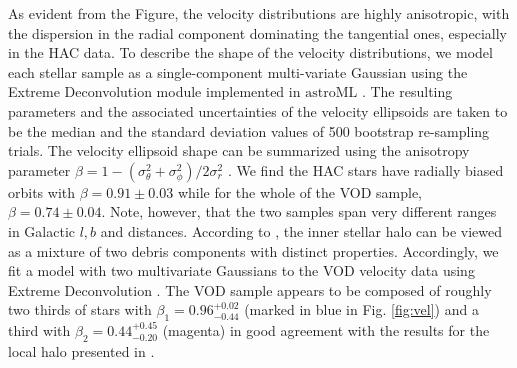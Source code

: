\documentclass[fleqn,usenatbib]{mnras}
\begin{document}
As evident from the Figure, the velocity distributions are highly
anisotropic, with the dispersion in the radial component dominating
the tangential ones, especially in the HAC data. To describe the shape
of the velocity distributions, we model each stellar sample as a
single-component multi-variate Gaussian using the Extreme
Deconvolution module implemented in $\mathrm{astroML}$
\citep{astroML}. The resulting parameters and the associated
uncertainties of the velocity ellipsoids are taken to be the median
and the standard deviation values of 500 bootstrap re-sampling trials.
The velocity ellipsoid shape can be summarized using the anisotropy
parameter $\beta=1-(\sigma^2_{\theta}+\sigma^2_{\phi})/2\sigma^2_r$
\citep[see][]{Binney2008}. We find the HAC stars have radially biased
orbits with $\beta = 0.91 \pm 0.03$ while for the whole of the VOD
sample, $\beta = 0.74 \pm 0.04$. Note, however, that the two samples
span very different ranges in Galactic $l,b$ and distances. According
to \citet{Belokurov2018}, the inner stellar halo can be viewed as a
mixture of two debris components with distinct
properties. Accordingly, we fit a model with two multivariate
Gaussians to the VOD velocity data using Extreme Deconvolution
\citep[see][]{ED}. The VOD sample appears to be composed of roughly
two thirds of stars with $\beta_{1}= 0.96^{+0.02}_{-0.44}$ (marked in
blue in Fig. \ref{fig:vel}) and a third with
$\beta_{2}=0.44^{+0.45}_{-0.20}$ (magenta) in good agreement with the
results for the local halo presented in \citet{Belokurov2018}.
%
\end{document}
